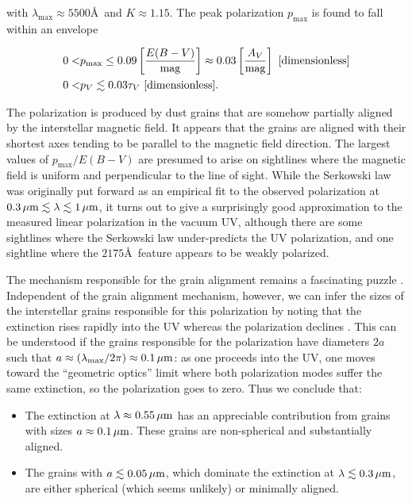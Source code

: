 \documentclass[a4paper,10pt]{article}
\begin{document}
{\noindent}with $\lambda_\mathrm{max}\approx5500$\AA~and $K\approx1.15$. The peak polarization $p_\mathrm{max}$ is found to fall within an envelope

\begin{align*}
    0 < &p_\mathrm{max} \leq 0.09 \left[\frac{E(B-V)}{{\rm mag}}\right] \approx 0.03\left[\frac{A_V}{{\rm mag}}\right] ~ [{\rm dimensionless}] \\
    0 < &p_V \lesssim 0.03\tau_V ~ [{\rm dimensionless}].
\end{align*}

{\noindent}The polarization is produced by dust grains that are somehow partially aligned by the interstellar magnetic field. It appears that the grains are aligned with their shortest axes tending to be parallel to the magnetic field direction. The largest values of $p_\mathrm{max}/E(B-V)$ are presumed to arise on sightlines where the magnetic field is uniform and perpendicular to the line of sight. While the Serkowski law was originally put forward as an empirical fit to the observed polarization at $0.3\,\mu{\rm m}\lesssim \lambda \lesssim 1\,\mu{\rm m}$, it turns out to give a surprisingly good approximation to the measured linear polarization in the vacuum UV, although there are some sightlines where the Serkowski law under-predicts the UV polarization, and one sightline where the $2175$\AA~feature appears to be weakly polarized.

{\noindent}The mechanism responsible for the grain alignment remains a fascinating puzzle . Independent of the grain alignment mechanism, however, we can infer the sizes of the interstellar grains responsible for this polarization by noting that the extinction rises rapidly into the UV whereas the polarization declines . This can be understood if the grains responsible for the polarization have diameters $2a$ such that $a\approx(\lambda_{\rm max}/2\pi)\approx0.1\,\mu{\rm m}$: as one proceeds into the UV, one moves toward the ``geometric optics'' limit where both polarization modes suffer the same extinction, so the polarization goes to zero. Thus we conclude that:

\begin{itemize}
    \item The extinction at $\lambda\approx0.55\,\mu{\rm m}$ has an appreciable contribution from grains with sizes $a\approx0.1\,\mu{\rm m}$. These grains are non-spherical and substantially aligned.
    \item The grains with $a\lesssim0.05\,\mu{\rm m}$, which dominate the extinction at $\lambda\lesssim0.3\,\mu{\rm m}$, are either spherical (which seems unlikely) or minimally aligned.
\end{itemize}
\end{document}

